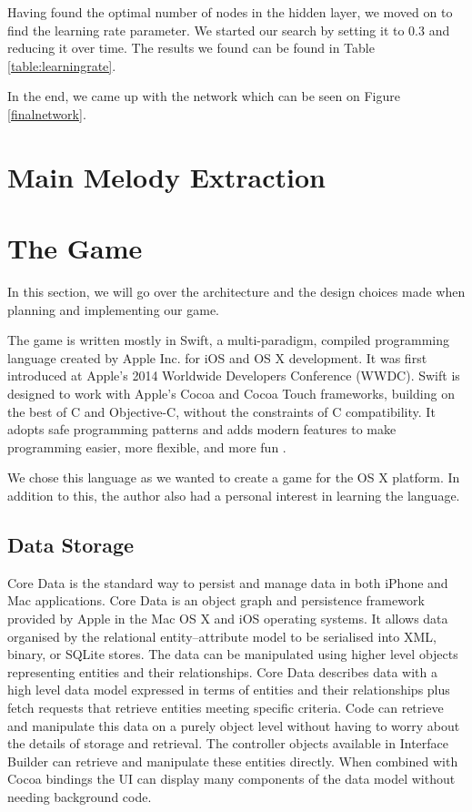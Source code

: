 Having found the optimal number of nodes in the hidden layer, we moved on to find the learning rate parameter. We started our search by setting it to 0.3 and reducing it over time. The results we found can be found in Table \ref{table:learningrate}.


In the end, we came up with the network which can be seen on Figure \ref{finalnetwork}.

\vspace{20pt}

\section{Main Melody Extraction}

\vspace{10pt}

\section{The Game}

In this section, we will go over the architecture and the design choices made when planning and implementing our game.

The game is written mostly in Swift, a multi-paradigm, compiled programming language created by Apple Inc. for iOS and OS X development. 
It was first introduced at Apple's 2014 Worldwide Developers Conference (WWDC). Swift is designed to work with Apple's Cocoa and Cocoa Touch frameworks, building on the best of C and Objective-C, without the constraints of C compatibility. It adopts safe programming patterns and adds modern features to make programming easier, more flexible, and more fun \cite{swiftintro}. 

We chose this language as we wanted to create a game for the OS X platform. In addition to this, the author also had a personal interest in learning the language.

\vspace{10pt}

\subsection{Data Storage}
Core Data is the standard way to persist and manage data in both iPhone and Mac applications. Core Data is an object graph and persistence framework provided by Apple in the Mac OS X and iOS operating systems. It allows data organised by the relational entity–attribute model to be serialised into XML, binary, or SQLite stores. The data can be manipulated using higher level objects representing entities and their relationships.
Core Data describes data with a high level data model expressed in terms of entities and their relationships plus fetch requests that retrieve entities meeting specific criteria. Code can retrieve and manipulate this data on a purely object level without having to worry about the details of storage and retrieval. The controller objects available in Interface Builder can retrieve and manipulate these entities directly. When combined with Cocoa bindings the UI can display many components of the data model without needing background code.


